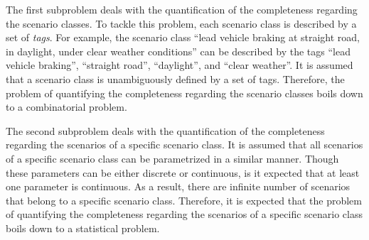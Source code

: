 \documentclass[10pt,final,a4paper,oneside,onecolumn]{article}
\theoremstyle{plain}\newtheorem{definition}{Definition}[section]    %
\theoremstyle{definition}\newtheorem{example}{Example}[section]     %
\theoremstyle{remark}\newtheorem{remarkenv}{Remark}[section]        %
\begin{document}
The first subproblem deals with the quantification of the completeness regarding the scenario classes. To tackle this problem, each scenario class is described by a set of \emph{tags}. For example, the scenario class ``lead vehicle braking at straight road, in daylight, under clear weather conditions'' can be described by the tags ``lead vehicle braking'', ``straight road'', ``daylight'', and ``clear weather''. It is assumed that a scenario class is unambiguously defined by a set of tags. Therefore, the problem of quantifying the completeness regarding the scenario classes boils down to a combinatorial problem.

The second subproblem deals with the quantification of the completeness regarding the scenarios of a specific scenario class. It is assumed that all scenarios of a specific scenario class can be parametrized in a similar manner. Though these parameters can be either discrete or continuous, is it expected that at least one parameter is continuous. As a result, there are infinite number of scenarios that belong to a specific scenario class. Therefore, it is expected that the problem of quantifying the completeness regarding the scenarios of a specific scenario class boils down to a statistical problem. 
\cbend

\end{document}
